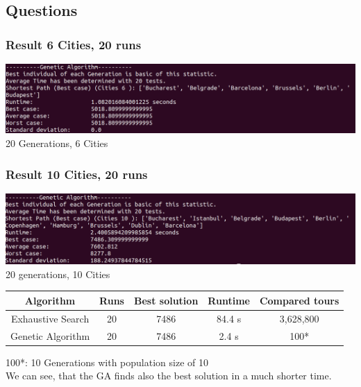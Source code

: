 \documentclass[10pt,a4paper]{article}
\begin{document}
	
	
	\subsection{Questions}
	\subsubsection{Result 6 Cities, 20 runs}
	\begin{center}
		\includegraphics[width=1\linewidth]{pictures/geneticAlgorithm/cities6}
		\\
		20 Generations, 6 Cities
		\\
	\end{center}
	
	
	\subsubsection{Result 10 Cities, 20 runs}
	\begin{center}
		\includegraphics[width=1\linewidth]{pictures/geneticAlgorithm/cities10}
		\\
		20 generations, 10 Cities	
		\\
	\end{center}
	\begin{center}
		\begin{tabular}{ | c |c | c | c | c|}
			\hline
			Algorithm & Runs & Best solution & Runtime & Compared tours \\ \hline
			Exhaustive Search & 20 & 7486 & 84.4 s  & 3,628,800 \\ \hline
			Genetic Algorithm & 20 & 7486 & 2.4 s & 100* \\ 
			\hline
		\end{tabular}
	\end{center}
	100*: 10 Generations with population size of 10 \\
	We can see, that the GA finds also the best solution in a much shorter time.
\end{document}
